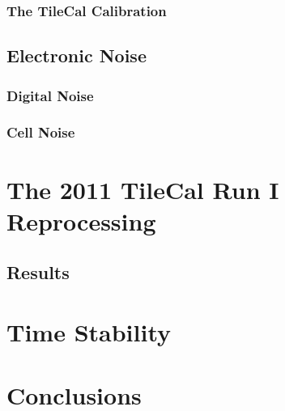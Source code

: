 \documentclass[10pt,twoside,cucitura,classica,english,openany]{toptesi}
\begin{document}


\subsubsection{The TileCal Calibration}
\label{sec:tilecal-calibration}



\subsection{Electronic Noise}
\label{sec:electronic-noise}



\subsubsection{Digital Noise}
\label{sec:digital-noise}



\subsubsection{Cell Noise}
\label{sec:cell-noise}



\section{The 2011 TileCal Run I Reprocessing}
\label{sec:2011-tilecal-run}



\subsection{Results}
\label{sec:results-1}



\section{Time Stability}
\label{sec:time-stability}



\section{Conclusions}
\label{sec:conclusions}
\end{document}
